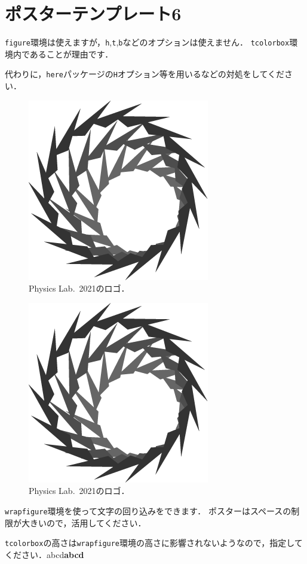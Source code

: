 \documentclass[12pt, a4j, dvipdfmx, sffamily]{jsarticle}
\begin{document}
\section*{ポスターテンプレート6}
\begin{tcbraster}[raster columns = 1]
	\begin{tcolorbox}[title = 画像（\texttt{figure}環境）]
	\texttt{figure}環境は使えますが，\texttt{h},\texttt{t},\texttt{b}などのオプションは使えません．
	\texttt{tcolorbox}環境内であることが理由です．
	
	代わりに，\texttt{here}パッケージの\texttt{H}オプション等を用いるなどの対処をしてください．
	\begin{figure}[H]
	\centering
	\includegraphics[width=0.2\linewidth]{logo_test.png}
	\caption{Physics Lab.~2021のロゴ．}
	\end{figure}
	\end{tcolorbox}
	\begin{tcolorbox}[title = 画像（\texttt{wrapfigure}環境）, height = 0.4\linewidth]
	\begin{figure}
	\centering
	\includegraphics[width=\linewidth]{logo_test.png}
	\caption{Physics Lab.~2021のロゴ．}
	\end{figure}
	\texttt{wrapfigure}環境を使って文字の回り込みをできます．
	ポスターはスペースの制限が大きいので，活用してください．
	
	\texttt{tcolorbox}の高さは\texttt{wrapfigure}環境の高さに影響されないようなので，指定してください．abcd\textbf{abcd}
	\end{tcolorbox}
\end{tcbraster}
\end{document}
